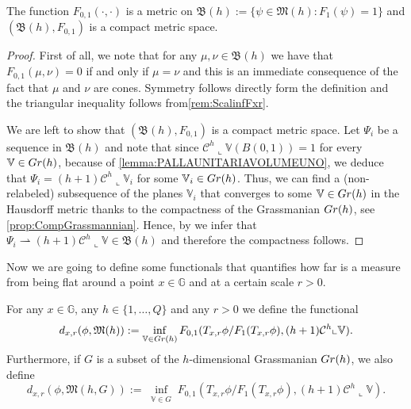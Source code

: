 \documentclass[10pt, a4paper,
oneside, headinclude,footinclude]{scrartcl}
\begin{document}
\begin{proposizione}\label{F1:metric}
The function $F_{0,1}(\cdot,\cdot)$ is a metric on $\mathfrak{B}(h):=\{\psi\in\mathfrak{M}(h):F_1(\psi)=1\}$ and $(\mathfrak{B}(h),F_{0,1})$ is a compact metric space.
\end{proposizione}

\begin{proof}
First of all, we note that for any $\mu,\nu\in\mathfrak{B}(h)$ we have that $F_{0,1}(\mu,\nu)=0$ if and only if $\mu=\nu$ and this is an immediate consequence of the fact that $\mu$ and $\nu$ are cones. Symmetry follows directly form the definition and the triangular inequality follows from\cref{rem:ScalinfFxr}.

We are left to show that $(\mathfrak{B}(h),F_{0,1})$ is a compact metric space. Let $\Psi_i$ be a sequence in $\mathfrak{B}(h)$ 
and note that since $\mathcal{C}^h\llcorner\mathbb V(B(0,1))=1$ for every $\mathbb V\in Gr(h)$, because of \cref{lemma:PALLAUNITARIAVOLUMEUNO}, we deduce that $\Psi_i=(h+1)\mathcal{C}^h\llcorner \mathbb{V}_i$ for some $\mathbb{V}_i\in Gr(h)$. Thus, we can find a (non-relabeled) subsequence of the planes $\mathbb{V}_i$ that converges to some $\mathbb{V}\in Gr(h)$ in the Hausdorff metric thanks to the compactness of the Grassmanian $Gr(h)$, see \cref{prop:CompGrassmannian}. Hence, by \cite[Proposition 2.29]{antonelli2020rectifiable} we infer that $\Psi_i\rightharpoonup (h+1)\mathcal{C}^{h}\llcorner \mathbb{V} \in \mathfrak{B}(h)$ and therefore the compactness follows.
\end{proof}


Now we are going to define some functionals that quantifies how far is a measure from being flat around a point $x\in\mathbb G$ and at a certain scale $r>0$.

\begin{definizione}[Definition of $d_{x,r}$]\label{def:metr}
For any $x\in\mathbb{G}$, any $h\in\{1,\ldots,Q\}$ and any $r>0$ we define the  functional
\begin{equation}
        d_{x,r}(\phi,\mathfrak{M}(h)):=\inf_{\substack{\mathbb V\in Gr(h)}} F_{0,1}(T_{x,r}\phi/F_1(T_{x,r}\phi), (h+1)\mathcal{C}^{h}\llcorner \mathbb V).
\end{equation}
Furthermore, if $G$ is a subset of the $h$-dimensional Grassmanian $Gr(h)$, we also define
\begin{equation}\label{eqn:Definitiondxr}
d_{x,r}(\phi,\mathfrak{M}(h,G)):=\inf_{\substack{\mathbb V\in G}} F_{0,1}(T_{x,r}\phi/F_1(T_{x,r}\phi), (h+1)\mathcal{C}^{h}\llcorner \mathbb V).
\end{equation}
\end{definizione}
\end{document}
